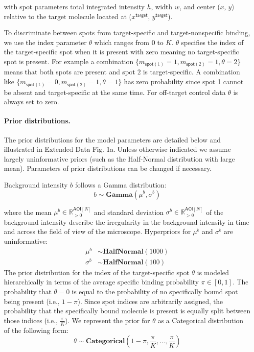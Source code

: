 \noindent
with spot parameters total integrated intensity $h$, width $w$, and center ($x$, $y$) relative to the target molecule located at ($x^\mathsf{target}$, $y^\mathsf{target}$). 
%

To discriminate between spots from target-specific and target-nonspecific binding, we use the index parameter $\theta$ which ranges from $0$ to $K$. $\theta$ specifies the index of the target-specific spot when it is present with zero meaning no target-specific spot is present. For example a combination $\{ m_{\mathsf{spot}(1)}=1, m_{\mathsf{spot}(2)}=1, \theta=2 \}$ means that both spots are present and spot 2 is target-specific. A combination like $\{ m_{\mathsf{spot}(1)}=0, m_{\mathsf{spot}(2)}=1, \theta=1 \}$ has zero probability since spot 1 cannot be absent and target-specific at the same time. For off-target control data $\theta$ is always set to zero.
%

\paragraph{Prior distributions.} The prior distributions for the model parameters are detailed below and illustrated in Extended Data Fig. 1a. Unless otherwise indicated we assume largely uninformative priors (such as the Half-Normal distribution with large mean). Parameters of prior distributions can be changed if necessary.

Background intensity $b$ follows a Gamma distribution:
%
\begin{equation}
    b \sim \mathbf{Gamma}(\mu^b, \sigma^b)
\end{equation}

\noindent
where the mean $\mu^b \in \mathbb{R}_{>0}^{\mathsf{AOI}[N]}$ and standard deviation $\sigma^b \in \mathbb{R}_{>0}^{\mathsf{AOI}[N]}$ of the background intensity describe the irregularity in the background intensity in time and across the field of view of the microscope. Hyperpriors for $\mu^b$ and $\sigma^b$ are uninformative:
%
\begin{subequations}
\begin{align}
    \mu^b &\sim \mathbf{HalfNormal}(1000) \\
    \sigma^b &\sim \mathbf{HalfNormal}(100)
\end{align}
\end{subequations}
%
The prior distribution for the index of the target-specific spot $\theta$ is modeled hierarchically in terms of the average specific binding probability $\pi \in [0, 1] $. The probability that $\theta = 0$ is equal to the probability of no specifically bound spot being present (i.e., $1-\pi$). Since spot indices are arbitrarily assigned, the probability that the specifically bound molecule is present is equally split between those indices (i.e., $\frac{\pi}{K}$). We represent the prior for $\theta$ as a Categorical distribution of the following form:
%
\begin{equation}
    \theta \sim \mathbf{Categorical}\left(1 - \pi, \frac{\pi}{K}, \dots, \frac{\pi}{K}\right)
\end{equation}

